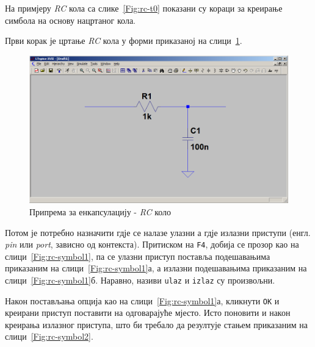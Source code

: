 На примјеру \textit{RC} кола са слике~\ref{Fig:rc-t0} показани су кораци за креирање симбола на основу нацртаног кола.

Први корак је цртање \textit{RC} кола у форми приказаној на слици~\ref{Fig:rc-symbol0}.

\begin{figure}[h]
\centering
\includegraphics[width=\figwidth\textwidth]{figs/rc-symbol0.PNG}
\caption{Припрема за енкапсулацију - \textit{RC} коло}
\label{Fig:rc-symbol0}
\end{figure}

Потом је потребно назначити гдје се налазе улазни а гдје излазни приступи (енгл. \textit{pin} или \textit{port}, зависно од контекста). Притиском на \texttt{F4}, добија се прозор као на слици~\ref{Fig:rc-symbol1}, па се улазни приступ поставља подешавањима приказаним на слици~\ref{Fig:rc-symbol1}а, а излазни подешавањима приказаним на слици~\ref{Fig:rc-symbol1}б. Наравно, називи \texttt{ulaz} и \texttt{izlaz} су произвољни.

Након постављања опција као на слици~\ref{Fig:rc-symbol1}а, кликнути \texttt{OK} и креирани приступ поставити на одговарајуће мјесто. Исто поновити и након креирања излазног приступа, што би требало да резултује стањем приказаним на слици~\ref{Fig:rc-symbol2}.

